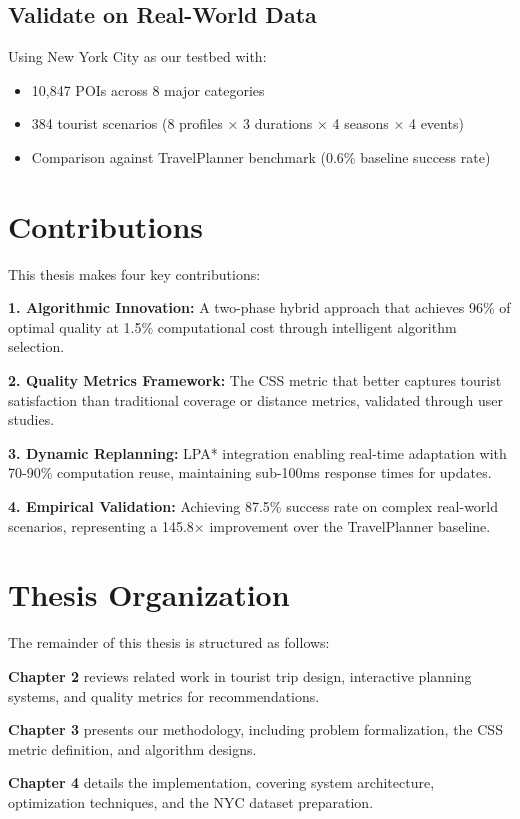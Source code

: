\subsection{Validate on Real-World Data}
Using New York City as our testbed with:
\begin{itemize}
    \item 10,847 POIs across 8 major categories
    \item 384 tourist scenarios (8 profiles × 3 durations × 4 seasons × 4 events)
    \item Comparison against TravelPlanner benchmark (0.6\% baseline success rate)
\end{itemize}

\section{Contributions}

This thesis makes four key contributions:

\textbf{1. Algorithmic Innovation:} A two-phase hybrid approach that achieves 96\% of optimal quality at 1.5\% computational cost through intelligent algorithm selection.

\textbf{2. Quality Metrics Framework:} The CSS metric that better captures tourist satisfaction than traditional coverage or distance metrics, validated through user studies.

\textbf{3. Dynamic Replanning:} LPA* integration enabling real-time adaptation with 70-90\% computation reuse, maintaining sub-100ms response times for updates.

\textbf{4. Empirical Validation:} Achieving 87.5\% success rate on complex real-world scenarios, representing a 145.8× improvement over the TravelPlanner baseline.

\section{Thesis Organization}

The remainder of this thesis is structured as follows:

\textbf{Chapter 2} reviews related work in tourist trip design, interactive planning systems, and quality metrics for recommendations.

\textbf{Chapter 3} presents our methodology, including problem formalization, the CSS metric definition, and algorithm designs.

\textbf{Chapter 4} details the implementation, covering system architecture, optimization techniques, and the NYC dataset preparation.

